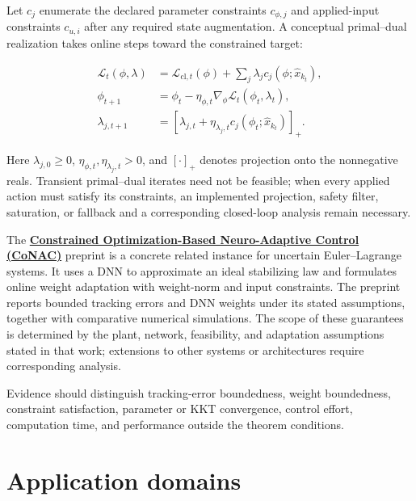 \documentclass[a4paper]{article}
\begin{document}
Let $c_j$ enumerate the declared parameter constraints $c_{\phi,j}$ and
applied-input constraints $c_{u,i}$ after any required state augmentation. A
conceptual primal--dual realization takes online steps toward the constrained
target:

\begin{equation}
  \begin{aligned}
    \mathscr L_t(\phi,\lambda)
    &=
    \mathcal L_{\mathrm{cl},t}(\phi)
    +
    \sum_j\lambda_jc_j(\phi;\widehat x_{k_t}),\\
    \phi_{t+1}
    &=
    \phi_t-\eta_{\phi,t}
    \nabla_\phi\mathscr L_t(\phi_t,\lambda_t),\\
    \lambda_{j,t+1}
    &=
    \left[
    \lambda_{j,t}
    +
    \eta_{\lambda_j,t}
    c_j(\phi_t;\widehat x_{k_t})
    \right]_+ .
  \end{aligned}
\end{equation}

Here $\lambda_{j,0}\ge0$,
$\eta_{\phi,t},\eta_{\lambda_j,t}>0$, and $[\cdot]_+$ denotes projection onto
the nonnegative reals. Transient primal--dual iterates need not be feasible;
when every applied action must satisfy its constraints, an implemented
projection, safety filter, saturation, or fallback and a corresponding
closed-loop analysis remain necessary.

The \href{https://kaist-mic-lab.github.io/publications/2025-CONAC-Robot/}{\textbf{Constrained Optimization-Based Neuro-Adaptive Control (CoNAC)}}
preprint is a concrete related instance for uncertain Euler--Lagrange systems.
It uses a DNN to approximate an ideal stabilizing law and formulates online
weight adaptation with weight-norm and input constraints. The preprint reports
bounded tracking errors and DNN weights under its stated assumptions, together
with comparative numerical simulations. The scope of these guarantees is
determined by the plant, network, feasibility, and adaptation assumptions stated
in that work; extensions to other systems or architectures require corresponding
analysis.

Evidence should distinguish tracking-error boundedness, weight boundedness,
constraint satisfaction, parameter or KKT convergence, control effort,
computation time, and performance outside the theorem conditions.

\section{Application domains}
\end{document}
